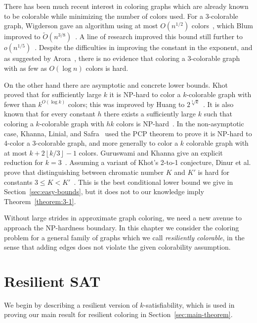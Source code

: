 There has been much recent interest in coloring graphs which are already known
to be colorable while minimizing the number of colors used. For a 3-colorable
graph, Wigderson gave an algorithm using at most $O(n^{1/2})$
colors~\cite{Wi83}, which Blum improved to $\tilde{O}(n^{3/8})$~\cite{Blum94}.
A line of research improved this bound still further to
$o(n^{1/5})$~\cite{KawarabayashiT14}. Despite the difficulties in improving the
constant in the exponent, and as suggested by Arora~\cite{Arora11}, there is no
evidence that coloring a 3-colorable graph with as few as $O(\log n)$ colors is
hard.

On the other hand there are asymptotic and concrete lower bounds.
Khot~\cite{Khot01} proved that for sufficiently large $k$ it is NP-hard to
color a $k$-colorable graph with fewer than $k^{O(\log{k})}$ colors; this was
improved by Huang to $2^{\sqrt[3]{k}}$~\cite{Huang13}. It is also known that
for every constant $h$ there exists a sufficiently large $k$ such that coloring
a $k$-colorable graph with $hk$ colors is NP-hard~\cite{DMR06}.  In the
non-asymptotic case, Khanna, Linial, and Safra~\cite{KLS00} used the PCP
theorem to prove it is NP-hard to 4-color a 3-colorable graph, and more
generally to color a $k$ colorable graph with at most $k + 2\left \lfloor k/3
\right \rfloor - 1$ colors. Guruswami and Khanna  give an explicit reduction
for $k=3$~\cite{GuKh2000}. Assuming a variant of Khot's 2-to-1 conjecture,
Dinur et al. prove that distinguishing between chromatic number $K$ and $K'$ is
hard for constants $3 \leq K < K'$~\cite{DMR06}. This is the best conditional
lower bound we give in Section~\ref{sec:easy-bounds}, but it does not to our
knowledge imply Theorem~\ref{theorem:3-1}.

Without large strides in approximate graph coloring, we need a new avenue to
approach the NP-hardness boundary. In this chapter we consider the coloring
problem for a general family of graphs which we call \emph{resiliently
colorable}, in the sense that adding edges does not violate the given
colorability assumption. 


\section{Resilient SAT}\label{sec:resilient-sat}

We begin by describing a resilient version of $k$-satisfiability, which is used
in proving our main result for resilient coloring in
Section~\ref{sec:main-theorem}. 

